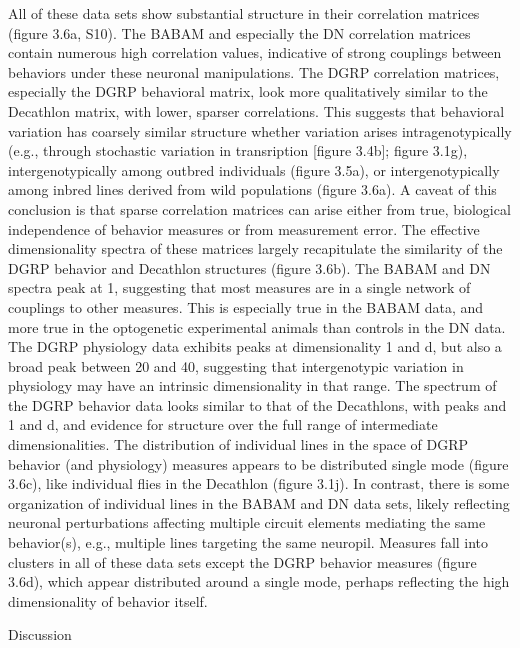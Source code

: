 \documentclass[12pt,letterpaper]{article}
\begin{document}
All of these data sets show substantial structure in their correlation matrices (figure 3.6a, S10). The BABAM and especially the DN correlation matrices contain numerous high correlation values, indicative of strong couplings between behaviors under these neuronal manipulations. The DGRP correlation matrices, especially the DGRP behavioral matrix, look more qualitatively similar to the Decathlon matrix, with lower, sparser correlations. This suggests that behavioral variation has coarsely similar structure whether variation arises intragenotypically (e.g., through stochastic variation in transription [figure 3.4b]; figure 3.1g), intergenotypically among outbred individuals (figure 3.5a), or intergenotypically among inbred lines derived from wild populations (figure 3.6a). A caveat of this conclusion is that sparse correlation matrices can arise either from true, biological independence of behavior measures or from measurement error. The effective dimensionality spectra of these matrices largely recapitulate the similarity of the DGRP behavior and Decathlon structures (figure 3.6b). The BABAM and DN spectra peak at 1, suggesting that most measures are in a single network of couplings to other measures. This is especially true in the BABAM data, and more true in the optogenetic experimental animals than controls in the DN data. The DGRP physiology data exhibits peaks at dimensionality 1 and d, but also a broad peak between 20 and 40, suggesting that intergenotypic variation in physiology may have an intrinsic dimensionality in that range. The spectrum of the DGRP behavior data looks similar to that of the Decathlons, with peaks and 1 and d, and evidence for structure over the full range of intermediate dimensionalities. The distribution of individual lines in the space of DGRP behavior (and physiology) measures appears to be distributed single mode (figure 3.6c), like individual flies in the Decathlon (figure 3.1j). In contrast, there is some organization of individual lines in the BABAM and DN data sets, likely reflecting neuronal perturbations affecting multiple circuit elements mediating the same behavior(s), e.g., multiple lines targeting the same neuropil. Measures fall into clusters in all of these data sets except the DGRP behavior measures (figure 3.6d), which appear distributed around a single mode, perhaps reflecting the high dimensionality of behavior itself. 


Discussion
\end{document}

